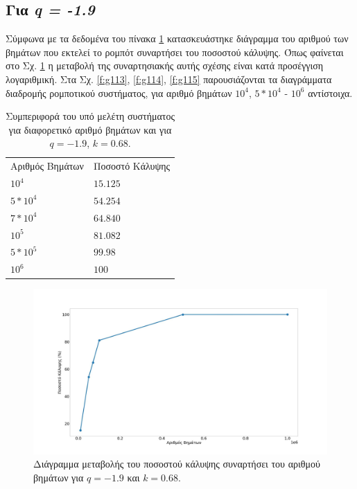 \clearpage

\subsection{Για \emph{q = -1.9}}

Σύμφωνα με τα δεδομένα του πίνακα \ref{tab:abc15} κατασκευάστηκε διάγραμμα του αριθμού των βημάτων που εκτελεί το ρομπότ συναρτήσει του ποσοστού κάλυψης. Όπως φαίνεται στο Σχ. \ref{f:g112} η μεταβολή της συναρτησιακής αυτής σχέσης είναι κατά προσέγγιση λογαριθμική. Στα Σχ. \ref{f:g113}, \ref{f:g114}, \ref{f:g115} παρουσιάζονται τα διαγράμματα διαδρομής ρομποτικού συστήματος, για αριθμό βημάτων $10^4$, $5*10^4$ - $10^6$ αντίστοιχα.

\begin{table}[ht]
	\centering
	\caption{Συμπεριφορά του υπό μελέτη συστήματος για διαφορετικό αριθμό βημάτων και για $q = -1.9$, $k = 0.68$.}
	\begin{tabular}{l | l }
		Αριθμός Βημάτων & Ποσοστό Κάλυψης \\
		
		$10^4$ &  $15.125$ \\
		$5*10^4$ & $54.254$\\
		$7*10^4$&  $64.840$ \\
		$10^5$ & $81.082$\\
		$5*10^5$& $99.98$\\
		$10^6$& $100$\\
		
	\end{tabular}	
	\label{tab:abc15}
\end{table}

\begin{figure}[ht]
	\centering
	\includegraphics[width=1\linewidth]{LateX images/log/steps/g2}
	\caption{Διάγραμμα μεταβολής του ποσοστού κάλυψης συναρτήσει του αριθμού βημάτων για $q = -1.9$ και $k= 0.68$.}
	\label{f:g112}	
\end{figure}

